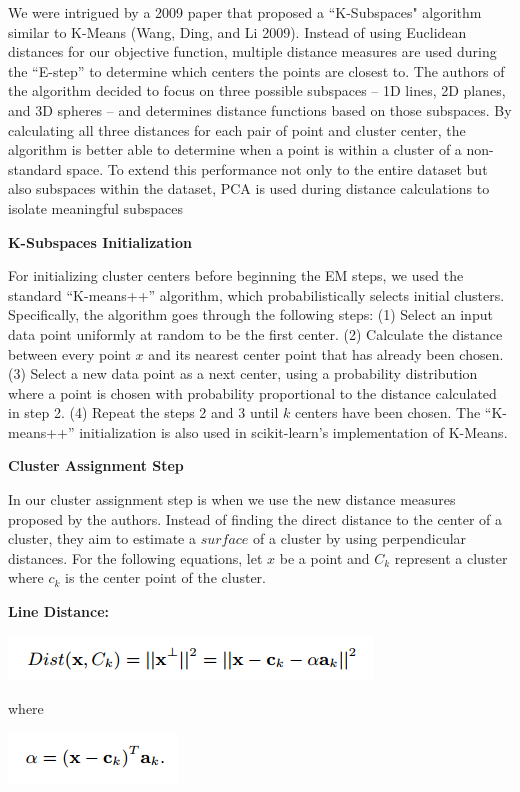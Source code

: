 \documentclass[12pt]{article}
\begin{document}
\begin{enumerate}
We were intrigued by a 2009 paper that proposed a ``K-Subspaces" algorithm similar to K-Means (Wang, Ding, and Li 2009). Instead of using Euclidean distances for our objective function, multiple distance measures are used during the ``E-step'' to determine which centers the points are closest to. The authors of the algorithm decided to focus on three possible subspaces -- 1D lines, 2D planes, and 3D spheres -- and determines distance functions based on those subspaces. By calculating all three distances for each pair of point and cluster center, the algorithm is better able to determine when a point is within a cluster of a non-standard space. To extend this performance not only to the entire dataset but also subspaces within the dataset, PCA is used during distance calculations to isolate meaningful subspaces

\textbf{K-Subspaces Initialization} 

For initializing cluster centers before beginning the EM steps, we used the standard ``K-means++'' algorithm, which probabilistically selects initial clusters. Specifically, the algorithm goes through the following steps: (1) Select an input data point uniformly at random to be the first center. (2) Calculate the distance between every point $x$ and its nearest center point that has already been chosen. (3) Select a new data point as a next center, using a probability distribution where a point is chosen with probability proportional to the distance calculated in step 2. (4) Repeat the steps 2 and 3 until $k$ centers have been chosen. The ``K-means++'' initialization is also used in scikit-learn’s implementation of K-Means.

\textbf{Cluster Assignment Step}

In our cluster assignment step is when we use the new distance measures proposed by the authors. Instead of finding the direct distance to the center of a cluster, they aim to estimate a $\textit{surface}$ of a cluster by using perpendicular distances. For the following equations, let $x$ be a point and $C_k$ represent a cluster where $c_k$ is the center point of the cluster. 

\smallskip
\textbf{Line Distance:}

\includegraphics[scale=0.75]{eq1.png}

where

\includegraphics[scale=0.75]{eq12.png}


\end{enumerate}
\end{document}
